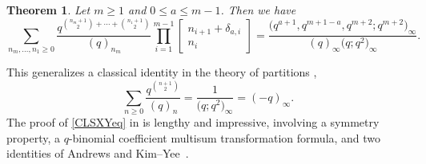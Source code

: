 \documentclass[pdftex]{sigma}
\newtheorem{Theorem}{Theorem}[section]
\numberwithin{equation}{section}
\begin{document}
\begin{Theorem} \label{CLSXYthm}
	Let $m \geq 1$ and $0 \leq a \leq m-1$. Then we have
	\begin{equation} \label{CLSXYeq}
		\sum_{n_m, \dots, n_1 \geq 0} \frac{q^{\binom{n_m + 1}{2} + \cdots + \binom{n_1+1}{2}}}{(q)_{n_m}} \prod_{i=1}^{m-1} \begin{bmatrix} n_{i+1} + \delta_{a,i} \\ n_i \end{bmatrix} = \frac{\bigl(q^{a+1},q^{m+1-a},q^{m+2};q^{m+2}\bigr)_{\infty}}{(q)_{\infty}\bigl(q;q^2\bigr)_{\infty}}.
	\end{equation}
\end{Theorem}
\noindent This generalizes a classical identity in the theory of partitions \cite[equation~(2.26), $t=q$]{AndBook},
\begin{equation*}
	\sum_{n \geq 0} \frac{q^{\binom{n+1}{2}}}{(q)_n} = \frac{1}{\bigl(q;q^2\bigr)_{\infty}} = (-q)_{\infty}.
\end{equation*}
The proof of \eqref{CLSXYeq} in \cite{CLSXY} is lengthy and impressive, involving a symmetry property, a $q$-binomial coefficient multisum transformation formula, and two identities of Andrews \cite{AndParity} and Kim--Yee~\cite{KimYee}.
\end{document}
